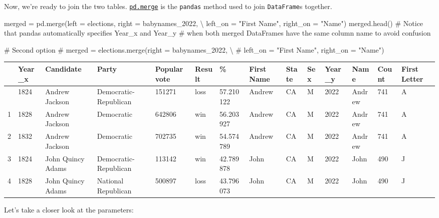 \documentclass[
  letterpaper,
  DIV=11,
  numbers=noendperiod]{scrreprt}
\newenvironment{Shaded}{\begin{snugshade}}{\end{snugshade}}
\newcommand{\CommentTok}[1]{\textcolor[rgb]{0.37,0.37,0.37}{#1}}
\newcommand{\NormalTok}[1]{\textcolor[rgb]{0.00,0.23,0.31}{#1}}
\newcommand{\OperatorTok}[1]{\textcolor[rgb]{0.37,0.37,0.37}{#1}}
\newcommand{\StringTok}[1]{\textcolor[rgb]{0.13,0.47,0.30}{#1}}
\begin{document}
Now, we're ready to join the two tables.
\href{https://pandas.pydata.org/docs/reference/api/pandas.DataFrame.merge.html}{\texttt{pd.merge}}
is the \texttt{pandas} method used to join \texttt{DataFrame}s together.

\begin{Shaded}
\begin{Highlighting}[]
\NormalTok{merged }\OperatorTok{=}\NormalTok{ pd.merge(left }\OperatorTok{=}\NormalTok{ elections, right }\OperatorTok{=}\NormalTok{ babynames\_2022, }\OperatorTok{\textbackslash{}}
\NormalTok{                  left\_on }\OperatorTok{=} \StringTok{"First Name"}\NormalTok{, right\_on }\OperatorTok{=} \StringTok{"Name"}\NormalTok{)}
\NormalTok{merged.head()}
\CommentTok{\# Notice that pandas automatically specifies \textasciigrave{}Year\_x\textasciigrave{} and \textasciigrave{}Year\_y\textasciigrave{} }
\CommentTok{\# when both merged DataFrames have the same column name to avoid confusion}

\CommentTok{\# Second option}
\CommentTok{\# merged = elections.merge(right = babynames\_2022, \textbackslash{}}
    \CommentTok{\# left\_on = "First Name", right\_on = "Name")}
\end{Highlighting}
\end{Shaded}

\begin{longtable}[]{@{}llllllllllllll@{}}
\toprule\noalign{}
& Year\_x & Candidate & Party & Popular vote & Result & \% & First Name
& State & Sex & Year\_y & Name & Count & First Letter \\
\midrule\noalign{}
\endhead
\bottomrule\noalign{}
\endlastfoot
0 & 1824 & Andrew Jackson & Democratic-Republican & 151271 & loss &
57.210122 & Andrew & CA & M & 2022 & Andrew & 741 & A \\
1 & 1828 & Andrew Jackson & Democratic & 642806 & win & 56.203927 &
Andrew & CA & M & 2022 & Andrew & 741 & A \\
2 & 1832 & Andrew Jackson & Democratic & 702735 & win & 54.574789 &
Andrew & CA & M & 2022 & Andrew & 741 & A \\
3 & 1824 & John Quincy Adams & Democratic-Republican & 113142 & win &
42.789878 & John & CA & M & 2022 & John & 490 & J \\
4 & 1828 & John Quincy Adams & National Republican & 500897 & loss &
43.796073 & John & CA & M & 2022 & John & 490 & J \\
\end{longtable}

Let's take a closer look at the parameters:
\end{document}
